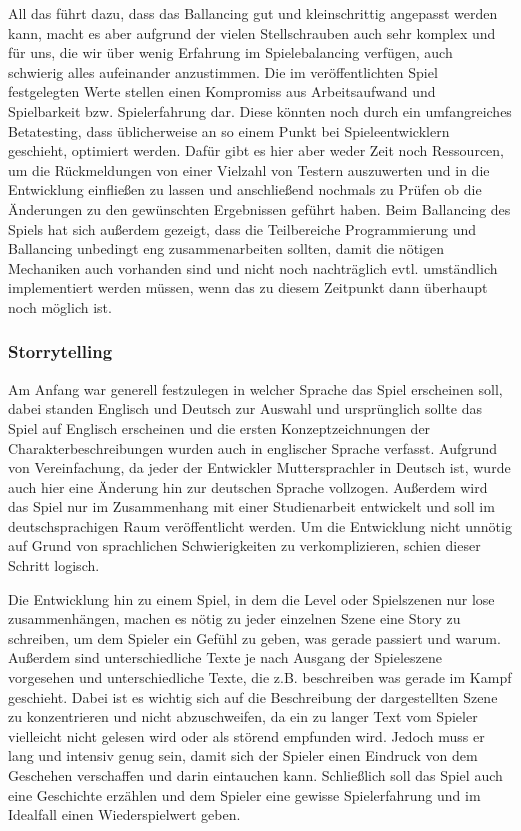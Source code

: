 All das führt dazu, dass das Ballancing gut und kleinschrittig angepasst werden kann, macht es aber aufgrund der vielen Stellschrauben auch sehr komplex und für uns, die wir über wenig Erfahrung im Spielebalancing verfügen, auch schwierig alles aufeinander anzustimmen. Die im veröffentlichten Spiel festgelegten Werte stellen einen Kompromiss aus Arbeitsaufwand und Spielbarkeit bzw. Spielerfahrung dar. Diese könnten noch durch ein umfangreiches Betatesting, dass üblicherweise an so einem Punkt bei Spieleentwicklern geschieht, optimiert werden. Dafür gibt es hier aber weder Zeit noch Ressourcen, um die Rückmeldungen von einer Vielzahl von Testern auszuwerten und in die Entwicklung einfließen zu lassen und anschließend nochmals zu Prüfen ob die Änderungen zu den gewünschten Ergebnissen geführt haben. Beim Ballancing des Spiels hat sich außerdem gezeigt, dass die Teilbereiche Programmierung und Ballancing unbedingt eng zusammenarbeiten sollten, damit die nötigen Mechaniken auch vorhanden sind und nicht noch nachträglich evtl. umständlich implementiert werden müssen, wenn das zu diesem Zeitpunkt dann überhaupt noch möglich ist.

\subsubsection{Storrytelling} Am Anfang war generell festzulegen in welcher Sprache das Spiel erscheinen soll, dabei standen Englisch und Deutsch zur Auswahl und ursprünglich sollte das Spiel auf Englisch erscheinen und die ersten Konzeptzeichnungen der Charakterbeschreibungen wurden auch in englischer Sprache verfasst. Aufgrund von Vereinfachung, da jeder der Entwickler Muttersprachler in Deutsch ist, wurde auch hier eine Änderung hin zur deutschen Sprache vollzogen. Außerdem wird das Spiel nur im Zusammenhang mit einer Studienarbeit entwickelt und soll im deutschsprachigen Raum veröffentlicht werden. Um die Entwicklung nicht unnötig auf Grund von sprachlichen Schwierigkeiten zu verkomplizieren, schien dieser Schritt logisch. 

Die Entwicklung hin zu einem Spiel, in dem die Level oder Spielszenen nur lose zusammenhängen, machen es nötig zu jeder einzelnen Szene eine Story zu schreiben, um dem Spieler ein Gefühl zu geben, was gerade passiert und warum. Außerdem sind unterschiedliche Texte je nach Ausgang der Spieleszene vorgesehen und unterschiedliche Texte, die z.B. beschreiben was gerade im Kampf geschieht. Dabei ist es wichtig sich auf die Beschreibung der dargestellten Szene zu konzentrieren und nicht abzuschweifen, da ein zu langer Text vom Spieler vielleicht nicht gelesen wird oder als störend empfunden wird. Jedoch muss er lang und intensiv genug sein, damit sich der Spieler einen Eindruck von dem Geschehen verschaffen und darin eintauchen kann. Schließlich soll das Spiel auch eine Geschichte erzählen und dem Spieler eine gewisse Spielerfahrung und im Idealfall einen Wiederspielwert geben. 

